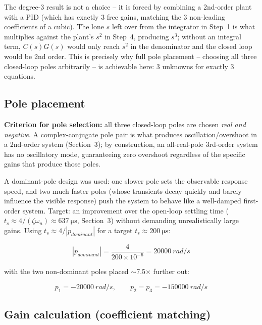 \documentclass[11pt,letterpaper]{article}
\begin{document}
The degree-3 result is not a choice -- it is forced by combining a 2nd-order plant with a PID (which has
exactly 3 free gains, matching the 3 non-leading coefficients of a cubic). The lone $s$ left over from the
integrator in Step~1 is what multiplies against the plant's $s^2$ in Step~4, producing $s^3$; without an
integral term, $C(s)G(s)$ would only reach $s^2$ in the denominator and the closed loop would be 2nd
order. This is precisely why full pole placement -- choosing all three closed-loop poles arbitrarily -- is
achievable here: 3 unknowns for exactly 3 equations.

\subsection{Pole placement}

\textbf{Criterion for pole selection:} all three closed-loop poles are chosen \emph{real and negative}.
A complex-conjugate pole pair is what produces oscillation/overshoot in a 2nd-order system (Section~3); by
construction, an all-real-pole 3rd-order system has no oscillatory mode, guaranteeing zero overshoot
regardless of the specific gains that produce those poles.

A dominant-pole design was used: one slower pole sets the observable response speed, and two much faster
poles (whose transients decay quickly and barely influence the visible response) push the system to
behave like a well-damped first-order system. Target: an improvement over the open-loop settling time
($t_s\approx4/(\zeta\omega_n)\approx\SI{637}{\micro\second}$, Section~3) without demanding unrealistically
large gains. Using $t_s\approx4/|p_{dominant}|$ for a target $t_s\approx\SI{200}{\micro\second}$:

\begin{equation}
|p_{dominant}| = \frac{4}{200\times10^{-6}} = \SI{20000}{rad/s}
\end{equation}

with the two non-dominant poles placed $\sim$7.5$\times$ further out:

\begin{tcolorbox}[colback=blue!5,colframe=blue!40!black,arc=1mm]
\begin{equation}
p_1 = -\SI{20000}{rad/s}, \qquad p_2=p_3=-\SI{150000}{rad/s}
\end{equation}
\end{tcolorbox}

\subsection{Gain calculation (coefficient matching)}
\end{document}
